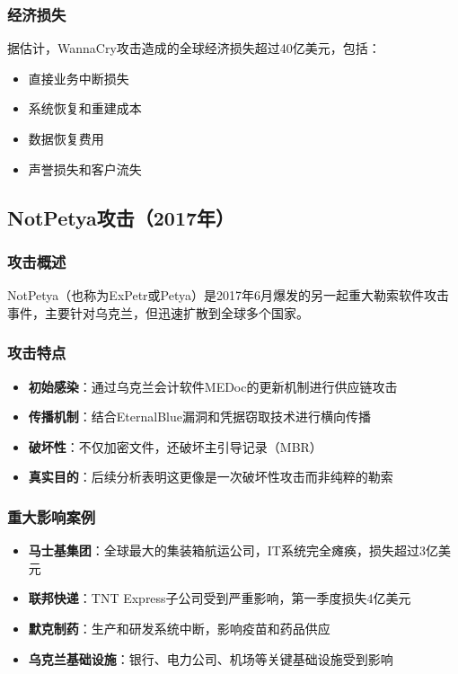 \documentclass[12pt,a4paper]{article}
\begin{document}
\subsubsection{经济损失}
据估计，WannaCry攻击造成的全球经济损失超过40亿美元，包括：
\begin{itemize}
    \item 直接业务中断损失
    \item 系统恢复和重建成本
    \item 数据恢复费用
    \item 声誉损失和客户流失
\end{itemize}

\subsection{NotPetya攻击（2017年）}

\subsubsection{攻击概述}
NotPetya（也称为ExPetr或Petya）是2017年6月爆发的另一起重大勒索软件攻击事件，主要针对乌克兰，但迅速扩散到全球多个国家。

\subsubsection{攻击特点}
\begin{itemize}
    \item \textbf{初始感染}：通过乌克兰会计软件MEDoc的更新机制进行供应链攻击
    \item \textbf{传播机制}：结合EternalBlue漏洞和凭据窃取技术进行横向传播
    \item \textbf{破坏性}：不仅加密文件，还破坏主引导记录（MBR）
    \item \textbf{真实目的}：后续分析表明这更像是一次破坏性攻击而非纯粹的勒索
\end{itemize}

\subsubsection{重大影响案例}
\begin{itemize}
    \item \textbf{马士基集团}：全球最大的集装箱航运公司，IT系统完全瘫痪，损失超过3亿美元
    \item \textbf{联邦快递}：TNT Express子公司受到严重影响，第一季度损失4亿美元
    \item \textbf{默克制药}：生产和研发系统中断，影响疫苗和药品供应
    \item \textbf{乌克兰基础设施}：银行、电力公司、机场等关键基础设施受到影响
\end{itemize}
\end{document}
